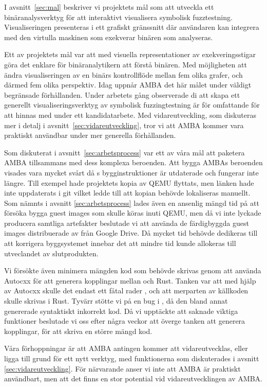 I avsnitt~\ref{sec:mal} beskriver vi projektets mål som att utveckla ett
binäranalysverktyg för att interaktivt visualisera symbolisk fuzztestning.
Visualiseringen presenteras i ett grafiskt gränssnitt där användaren kan
integrera med den virtulla maskinen som exekverar binären som analyseras.

Ett av projektets mål var att med visuella representationer av exekveringsstigar
göra det enklare för binäranalytikern att förstå binären. Med möjligheten att
ändra visualiseringen av en binärs kontrollflöde mellan fem olika grafer, och
därmed fem olika perspektiv. Idag uppnår AMBA det här målet under väldigt
begränsade förhållanden. Under arbetets gång observerade di att skapa ett
generellt visualiseringsverktyg av symbolisk fuzzingtestning är för omfattande
för att hinnas med under ett kandidatarbete. Med vidareutveckling, som
diskuteras mer i detalj i avsnitt~\ref{sec:vidareutveckling}, tror vi att AMBA
kommer vara praktiskt användbar under mer generella förhållanden.

Som diskuterat i avsnitt~\ref{sec:arbetsprocess} var ett av våra mål att
paketera AMBA tillsammans med dess komplexa beroenden. Att bygga AMBAs beroenden
visades vara mycket svårt då \stoe{}s bygginstruktioner är utdaterade och
fungerar inte längre. Till exempel hade \stoe{} projektets kopia av QEMU
flyttats, men länken hade inte uppdaterats i git vilket ledde till att kopian
behövde lokaliseras manuellt. Som nämnts i avsnitt \ref{sec:arbetsprocess} lades
även en ansenlig mängd tid på att försöka bygga guest images som skulle köras
inuti QEMU, men då vi inte lyckade producera samtliga artefakter beslutade vi
att använda de färdigbyggda guest images distribuerade av \stoe{} från Google
Drive. Då mycket tid behövde dedikeras till att korrigera byggsystemet innebar
det att mindre tid kunde allokeras till utveclandet av slutprodukten.

Vi försökte även minimera mängden  kod som behövde skrivas genom
att använda Autocxx för att generera kopplingar mellan  och Rust.
Tanken var att med hjälp av Autocxx skulle det endast ett fåtal rader
, och att merparten av källkoden skulle skrivas i Rust. Tyvärr
stötte vi på en bug i , då den bland annat genererade
syntaktiskt inkorrekt kod. Då vi upptäckte att  saknade
viktiga funktioner beslutade vi oss efter några veckor att överge tanken att
generera kopplingar, för att skriva en större mängd  kod.

Våra förhoppningar är att AMBA antingen kommer att vidareutvecklas, eller ligga
till grund för ett nytt verktyg, med funktionerna som diskuterades i avsnitt
\ref{sec:vidareutveckling}. För närvarande anser vi inte att AMBA är praktiskt
användbart, men att det finns en stor potential vid vidareutvecklingen av AMBA.
